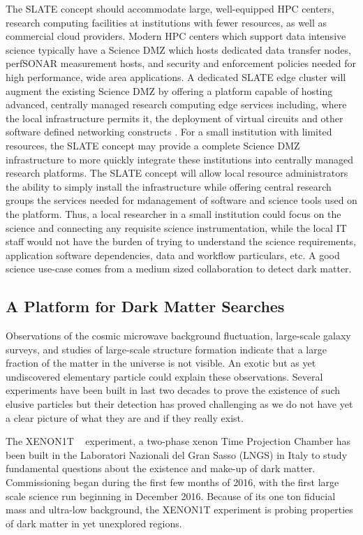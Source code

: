 \documentclass[sigconf]{acmart}
\begin{document}
The SLATE concept should accommodate large, well-equipped HPC centers, research computing facilities at institutions with fewer resources, as well as  commercial cloud providers.  Modern HPC centers which support data intensive science typically have a Science DMZ which hosts dedicated data transfer nodes, perfSONAR \cite{perfSONAR,perfSONAR_Publications} measurement hosts, and security and enforcement policies needed for high performance, wide area applications.  A dedicated SLATE edge cluster will augment the existing Science DMZ by offering a platform capable of hosting advanced, centrally managed research computing edge services including, where the local infrastructure permits it, the deployment of virtual circuits and other software defined networking constructs \cite{GENI_Stitching,McKeown2008}.  For a small institution with limited resources, the SLATE concept may provide a complete Science DMZ infrastructure to more quickly integrate these institutions into centrally managed research platforms.  The SLATE concept will allow local resource administrators the ability to simply install the infrastructure while offering central research groups the services needed for mdanagement of software and science tools used on the platform.  Thus, a local researcher in a small institution could focus on the science and connecting any requisite science instrumentation, while the local IT staff would not have the burden of trying to understand the science requirements, application software dependencies, data and workflow particulars, etc. A good science use-case comes from a medium sized collaboration to detect dark matter.

\subsection{A Platform for Dark Matter Searches}
Observations of the cosmic microwave background fluctuation, large-scale galaxy surveys, and studies of large-scale structure formation indicate that a large fraction of the matter in the universe is not visible. An exotic but as yet undiscovered elementary particle could explain these observations. Several experiments have been built in last two decades to prove the existence of such elusive particles but their detection has proved challenging as we do not have yet a clear picture of what they are and if they really exist. 

The XENON1T ~\cite{Aprile:2015uzo} experiment, a two-phase xenon Time Projection Chamber has been built in the Laboratori Nazionali del Gran Sasso (LNGS) in Italy to study fundamental questions about the existence and make-up of dark matter.  Commissioning began during the first few months of 2016, with the first large scale science run beginning in December 2016.  Because of its one ton fiducial mass and ultra-low background, the XENON1T experiment is probing properties of dark matter in yet unexplored regions.
\end{document}
